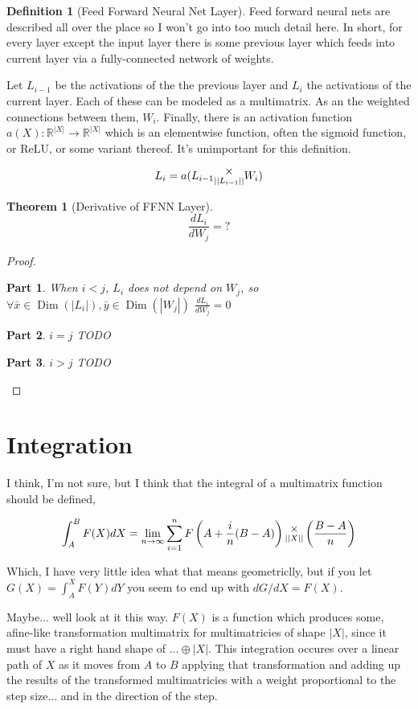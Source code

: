 \documentclass[12pt]{article}
\theoremstyle{definition}
\newtheorem{definition}{Definition}[section]
\theoremstyle{plain}
\newtheorem{theorem}{Theorem}[section]
\theoremstyle{ppart}
\newtheorem{ppart}{Part}
\DeclareMathOperator{\Dim}{Dim}
\newcommand{\mmult}[1]{\text{\raisebox{1ex}{$\underset{#1}{\times}$}}}
\begin{document}
\begin{definition}[Feed Forward Neural Net Layer]
Feed forward neural nets are described all over the place so I won't go into too
much detail here. In short, for every layer except the input layer there is some
previous layer which feeds into current layer via a fully-connected network of
weights.

Let $L_{i-1}$ be the activations of the the previous layer and $L_i$ the activations
of the current layer. Each of these can be modeled as a multimatrix. As an the weighted
connections between them, $W_i$. Finally, there is an activation function
$a(X) : \mathbb{R}^{|X|} \to \mathbb{R}^{|X|}$ which is an elementwise function,
often the sigmoid function, or ReLU, or some variant thereof. It's unimportant for this
definition.

\[ L_i = a(L_{i-1} \mmult{||L_{i-1}||} W_i) \]
\end{definition}

\begin{theorem}[Derivative of FFNN Layer]
\[ \frac{dL_i}{dW_j} = ? \]
\end{theorem}
\begin{proof}
\begin{ppart} When $i < j$,
$L_i$ does not depend on $W_j$, so 
$\forall \bar{x} \in \Dim(|L_i|), \bar{y} \in \Dim(|W_j|)$
$\frac{dL_i}{dW_j} = 0$
\end{ppart}
\begin{ppart} $i = j$
TODO
\end{ppart}
\begin{ppart} $i > j$
TODO
\end{ppart}
\end{proof}

\section{Integration}

I think, I'm not sure, but I think that the integral of a multimatrix function should
be defined,

\[
 \int_A^B F(X) dX = \lim_{n \to \infty}
 \sum_{i=1}^n
  F\left(A+\frac{i}{n}(B-A)\right)
  \mmult{||X||}
  \left(\frac{B-A}{n}\right)
\]

Which, I have very little idea what that means geometriclly, but
if you let $G(X) = \int_A^X F(Y) dY$ you seem to end up with $dG/dX = F(X)$.

Maybe... well look at it this way. $F(X)$ is a function which produces some,
afine-like transformation multimatrix for multimatricies of shape $|X|$,
since it must have a right hand shape of $\ldots \oplus |X|$. This integration
occures over a linear path of $X$ as it moves from $A$ to $B$ applying that
transformation and adding up the results of the transformed multimatricies with
a weight proportional to the step size... and in the direction of the step.
\end{document}
